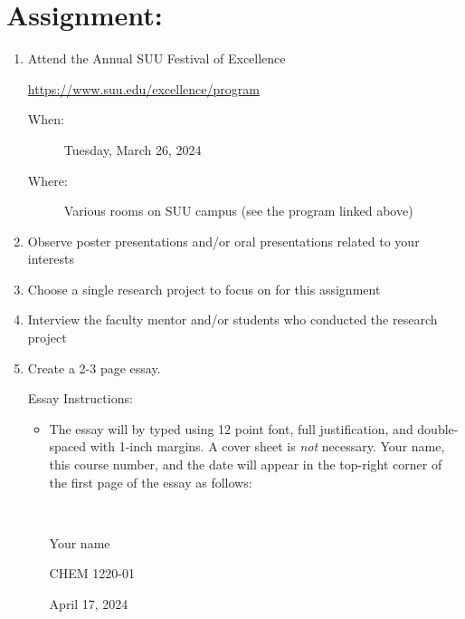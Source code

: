 \documentclass[12pt, letterpaper]{article}
\begin{document}
\section*{Assignment:}
\begin{enumerate}
  \item Attend the  Annual SUU Festival of Excellence

    \href{https://www.suu.edu/excellence/program}{https://www.suu.edu/excellence/program}
    \begin{description}
      \item[When: ] Tuesday, March 26, 2024
      \item[Where: ] Various rooms on SUU campus (see the program linked above)
    \end{description}
  \item Observe poster presentations and/or oral presentations related to your interests
  \item Choose a single research project to focus on for this assignment
  \item Interview the faculty mentor and/or students who conducted the research project
  \item Create a 2-3 page essay.

    Essay Instructions:
    \begin{itemize}
      \item The essay will by typed using 12 point font, full justification, and double-spaced with 1-inch margins. A cover sheet is \emph{not} necessary. Your name, this course number, and the date will appear in the top-right corner of the first page of the essay as follows:

        \hspace{0.8\linewidth} 
        \begin{minipage}[r]{0.2\linewidth}
          ~
          
            Your name

            CHEM 1220-01

            April 17, 2024  
          

\end{minipage}
\end{itemize}
\end{enumerate}
\end{document}

